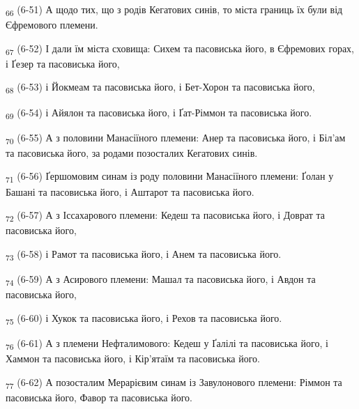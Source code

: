 \begin{tcolorbox}
\textsubscript{66} (6-51) А щодо тих, що з родів Кегатових синів, то міста границь їх були від Єфремового племени.
\end{tcolorbox}
\begin{tcolorbox}
\textsubscript{67} (6-52) І дали їм міста сховища: Сихем та пасовиська його, в Єфремових горах, і Ґезер та пасовиська його,
\end{tcolorbox}
\begin{tcolorbox}
\textsubscript{68} (6-53) і Йокмеам та пасовиська його, і Бет-Хорон та пасовиська його,
\end{tcolorbox}
\begin{tcolorbox}
\textsubscript{69} (6-54) і Айялон та пасовиська його, і Ґат-Ріммон та пасовиська його.
\end{tcolorbox}
\begin{tcolorbox}
\textsubscript{70} (6-55) А з половини Манасіїного племени: Анер та пасовиська його, і Біл'ам та пасовиська його, за родами позосталих Кегатових синів.
\end{tcolorbox}
\begin{tcolorbox}
\textsubscript{71} (6-56) Ґершомовим синам із роду половини Манасіїного племени: Ґолан у Башані та пасовиська його, і Аштарот та пасовиська його.
\end{tcolorbox}
\begin{tcolorbox}
\textsubscript{72} (6-57) А з Іссахарового племени: Кедеш та пасовиська його, і Доврат та пасовиська його,
\end{tcolorbox}
\begin{tcolorbox}
\textsubscript{73} (6-58) і Рамот та пасовиська його, і Анем та пасовиська його.
\end{tcolorbox}
\begin{tcolorbox}
\textsubscript{74} (6-59) А з Асирового племени: Машал та пасовиська його, і Авдон та пасовиська його,
\end{tcolorbox}
\begin{tcolorbox}
\textsubscript{75} (6-60) і Хукок та пасовиська його, і Рехов та пасовиська його.
\end{tcolorbox}
\begin{tcolorbox}
\textsubscript{76} (6-61) А з племени Нефталимового: Кедеш у Ґалілі та пасовиська його, і Хаммон та пасовиська його, і Кір'ятаїм та пасовиська його.
\end{tcolorbox}
\begin{tcolorbox}
\textsubscript{77} (6-62) А позосталим Мерарієвим синам із Завулонового племени: Ріммон та пасовиська його, Фавор та пасовиська його.
\end{tcolorbox}
